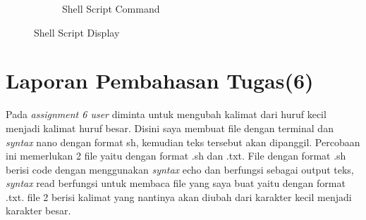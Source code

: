 \documentclass[11pt,a4paper]{article}
\begin{document}
\begin{figure}[h]
\begin{subfigure}[b]{0.4\textwidth}
		\caption{Shell Script Command}
		\label{fig:aug-2}
	\end{subfigure}
	\caption{Shell Script Display}\label{fig:aug}
\end{figure}

\section{Laporan Pembahasan Tugas(6)}
    Pada \textit{assignment 6 user} diminta untuk mengubah kalimat dari huruf kecil menjadi kalimat huruf besar. Disini saya membuat file dengan terminal dan \textit{syntax} nano dengan format sh, kemudian teks tersebut akan dipanggil. Percobaan ini memerlukan 2 file yaitu dengan format .sh dan .txt. File dengan format .sh berisi code dengan menggunakan \textit{syntax} echo dan berfungsi sebagai output teks, \textit{syntax} read berfungsi untuk membaca file yang saya buat yaitu dengan format .txt. file 2 berisi kalimat yang nantinya akan diubah dari karakter kecil menjadi karakter besar.
    
\end{document}
